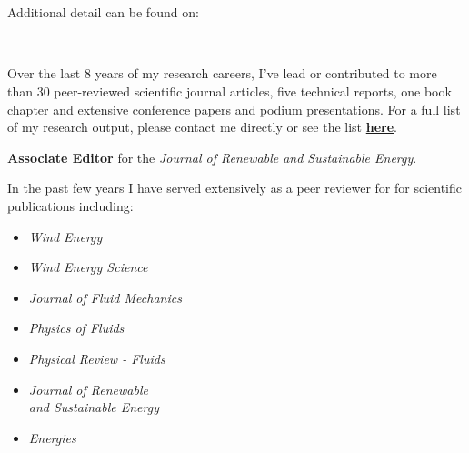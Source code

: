 
\\
\\
\vspace{1em}

Additional detail can be found on:
\vspace{1em}

\\

\divider


Over the last 8 years of my research careers, I've lead or contributed to more than 30 peer-reviewed scientific journal articles, five technical reports, one book chapter and extensive conference papers and podium presentations. For a full list of my research output, please contact me directly or see the list \href{https://github.com/nhamilto/Portfolio/blob/main/Hamilton_Portfolio_20201019.pdf}{\textbf{here}}.

\divider


\textbf{\color{accent}Associate Editor} for the \textit{Journal of Renewable and Sustainable Energy}.

\divider



In the past few years I have served extensively as a peer reviewer for for scientific publications including:
\begin{itemize}\normalsize
    \item \textit{Wind Energy}
    \item \textit{Wind Energy Science}
    \item \textit{Journal of Fluid Mechanics}
    \item \textit{Physics of Fluids}
    \item \textit{Physical Review - Fluids}
    \item \textit{Journal of Renewable \\and Sustainable Energy}
    \item \textit{Energies}
\end{itemize}

\divider

